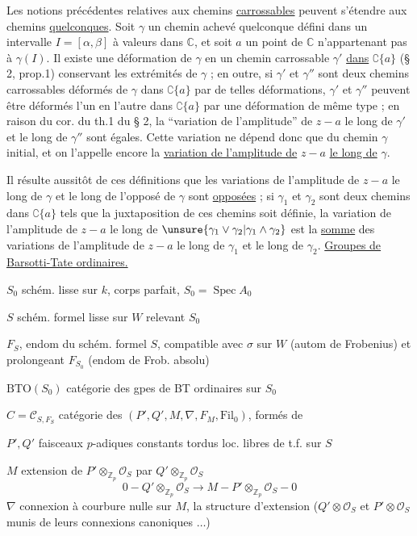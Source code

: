 Les notions précédentes relatives aux chemins \uline{carrossables} peuvent s'étendre aux chemins \uline{quelconques}. Soit $\gamma$ un chemin achevé quelconque défini dans un intervalle $I=[\alpha,\beta]$ à valeurs dans $\mathbb C$, et soit $a$ un point de $\mathbb C$ n'appartenant pas à $\gamma(I)$. Il existe une déformation de $\gamma$ en un chemin carrossable $\gamma'$ \uline{dans} $\complement\{a\}$ (§ 2, prop.1) conservant les extrémités de $\gamma$ ; en outre, si $\gamma'$ et $\gamma''$ sont deux chemins carrossables déformés de $\gamma$ dans $\complement\{a\}$ par de telles déformations, $\gamma'$ et $\gamma''$ peuvent être déformés l'un en l'autre dans $\complement\{a\}$ par une déformation de même type ; en raison du cor. du th.1 du § 2, la ``variation de l'amplitude'' de $z-a$ le long de $\gamma'$ et le long de $\gamma''$ sont égales. Cette variation ne dépend donc que du chemin $\gamma$ initial, et on l'appelle encore la \uline{variation de l'amplitude de} $z-a$ \uline{le long de} $\gamma$.

Il résulte aussitôt de ces définitions que les variations de l'amplitude de $z-a$ le long de $\gamma$ et le long de l'opposé de $\gamma$ sont \uline{opposées} ; si $\gamma_1$ et $\gamma_2$ sont deux chemins dans $\complement\{a\}$ tels que la juxtaposition de ces chemins soit définie, la variation de l'amplitude de $z-a$ le long de $\unsure{\gamma_1\vee\gamma_2|\gamma_1\wedge\gamma_2}$ est la \uline{somme} des variations de l'amplitude de $z-a$ le long de $\gamma_1$ et le long de $\gamma_2$.
\uline{Groupes de Barsotti-Tate ordinaires.}

$S_0$ schém. lisse sur $k$, corps parfait, $S_0=\operatorname{Spec}A_0$ 

$S$ schém. formel lisse sur $W$ relevant $S_0$

$F_S$, endom  du schém. formel $S$, compatible avec $\sigma$ sur $W$ (autom de Frobenius) et prolongeant $F_{S_0}$ (endom de Frob. absolu)

$\mathrm{BTO}(S_0)$ catégorie des gpes de BT ordinaires sur $S_0$

$C=\mathcal C_{S,F_S}$ catégorie des   $(P',Q',M,\nabla,F_M,\mathrm{Fil}_0)$, formés de

$P',Q'$ faisceaux $p$-adiques constants tordus  loc. libres de t.f. sur $S$

$M$ extension de $P'\otimes_{\mathbb Z_p}\mathcal O_S$ par $Q'\otimes_{\mathbb Z_p}\mathcal O_S$
\[
0\mathbin{-}Q'\otimes_{\mathbb Z_p}\mathcal O_S\longrightarrow M\mathbin{-}P'\otimes_{\mathbb Z_p}\mathcal O_S\mathbin{-}0
\]
$\nabla$ connexion à courbure nulle sur $M$,   la structure d'extension ($Q'\otimes\mathcal O_S$ et $P'\otimes\mathcal O_S$ munis de leurs connexions canoniques $\ldots$)

